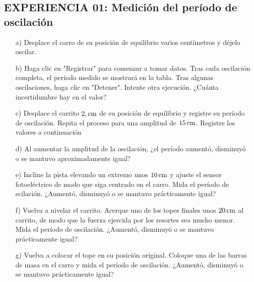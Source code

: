 \documentclass[9pt,a4paper,twocolumn,twoside]{tau-class/tau}
\begin{document}
\subsection{EXPERIENCIA 01: Medición del período de oscilación}
\begin{itemize}
            \item [a)]   Desplace  el  carro  de  su  posición  de  equilibrio  varios  centímetros  y  déjelo  oscilar.
            \item [b)]  Haga  clic  en  "Registrar"  para  comenzar  a  tomar  datos.  Tras  cada  oscilación  completa,  el  período  medido  se mostrará  en  la  tabla.  Tras  algunas  oscilaciones,  haga  clic  en  "Detener".  Intente  otra  ejecución.  ¿Cuánta  incertidumbre  hay  en  el  valor?
            \item [c)]  Desplace  el  carrito  $2,\rm  cm$  de  su  posición  de  equilibrio  y  registre  su  período  de  oscilación.  Repita  el  proceso  para  una  amplitud  de  $15\,\rm  cm$.  Registre  los  valores  a  continuación
            \item [d)]  Al  aumentar  la  amplitud  de  la  oscilación,  ¿el  período  aumentó,  disminuyó  o  se  mantuvo  aproximadamente igual?
            \item [e)]   Incline  la  pista  elevando  un  extremo  unos  $10\,\rm  cm$  y  ajuste  el  sensor  fotoeléctrico  de  modo  que  siga  centrado  en  el  carro.  Mida  el  período  de  scilación.  ¿Aumentó,  disminuyó  o  se  mantuvo  prácticamente  igual?
            \item [f)]  Vuelva  a  nivelar  el  carrito.  Acerque  uno  de  los  topes  finales  unos  $20\,\rm  cm$  al  carrito,  de  modo  que  la  fuerza  ejercida  por  los  resortes  sea  mucho  menor.  Mida  el  período  de  oscilación.  ¿Aumentó,  disminuyó  o  se  mantuvo  prácticamente  igual?
            \item[g)]  Vuelva  a  colocar  el  tope  en  su  posición  original.  Coloque  una  de  las  barras  de  masa  en  el  carro  y  mida  el  período  de  oscilación.  ¿Aumentó,  disminuyó  o  se  mantuvo  prácticamente  igual? 
        \end{itemize}
\end{document}
